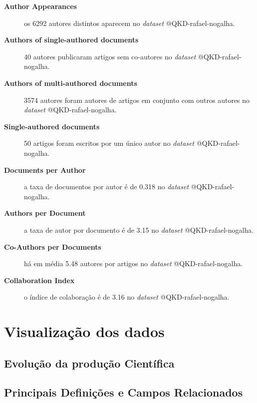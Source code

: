 \begin{description}
    \item[\textbf{Author Appearances}] os 6292 autores distintos aparecem no \textit{dataset} @QKD-rafael-nogalha.
    \item[\textbf{Authors of single-authored documents}] 40 autores publicaram artigos sem co-autores no \textit{dataset} @QKD-rafael-nogalha.
    \item[\textbf{Authors of multi-authored documents}] 3574 autores foram autores de artigos em conjunto com outros autores no \textit{dataset} @QKD-rafael-nogalha.
    \item[\textbf{Single-authored documents}] 50 artigos foram escritos por um único autor no \textit{dataset} @QKD-rafael-nogalha.
    \item[\textbf{Documents per Author}] a taxa de documentos por autor é de 0.318 no \textit{dataset} @QKD-rafael-nogalha.
    \item[\textbf{Authors per Document}] a taxa de autor por documento é de 3.15 no \textit{dataset} @QKD-rafael-nogalha.
    \item[\textbf{Co-Authors per Documents}] há em média 5.48 autores por artigos no \textit{dataset} @QKD-rafael-nogalha.
    \item[\textbf{Collaboration Index}] o índice de colaboração é de 3.16 no \textit{dataset} @QKD-rafael-nogalha.
\end{description}

\section{Visualização dos dados}

\subsection{Evolução da produção Científica}

\subsection{Principais Definições e Campos Relacionados}